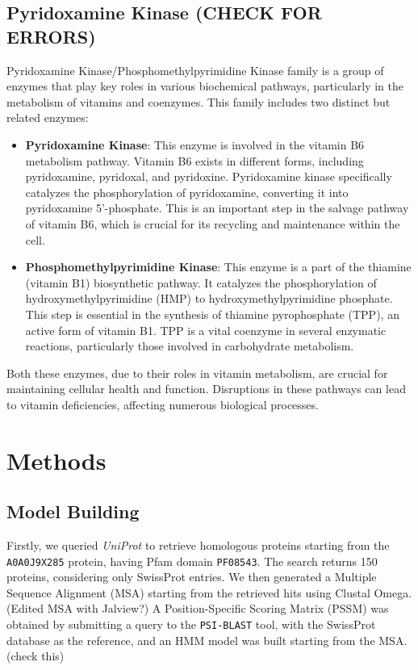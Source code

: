 \documentclass[10pt,twocolumn,letterpaper]{article}
\begin{document}
\subsection{Pyridoxamine Kinase (CHECK FOR ERRORS)}

Pyridoxamine Kinase/Phosphomethylpyrimidine Kinase family is a group of enzymes that play key roles in various biochemical pathways, particularly in the metabolism of vitamins and coenzymes. This family includes two distinct but related enzymes:

\begin{itemize}
\item \textbf{Pyridoxamine Kinase}: This enzyme is involved in the vitamin B6 metabolism pathway. Vitamin B6 exists in different forms, including pyridoxamine, pyridoxal, and pyridoxine. Pyridoxamine kinase specifically catalyzes the phosphorylation of pyridoxamine, converting it into pyridoxamine 5'-phosphate. This is an important step in the salvage pathway of vitamin B6, which is crucial for its recycling and maintenance within the cell.

\item \textbf{Phosphomethylpyrimidine Kinase}: This enzyme is a part of the thiamine (vitamin B1) biosynthetic pathway. It catalyzes the phosphorylation of hydroxymethylpyrimidine (HMP) to hydroxymethylpyrimidine phosphate. This step is essential in the synthesis of thiamine pyrophosphate (TPP), an active form of vitamin B1. TPP is a vital coenzyme in several enzymatic reactions, particularly those involved in carbohydrate metabolism.
\end{itemize}

Both these enzymes, due to their roles in vitamin metabolism, are crucial for maintaining cellular health and function. Disruptions in these pathways can lead to vitamin deficiencies, affecting numerous biological processes.

\section{Methods}

\subsection{Model Building}

Firstly, we queried \textit{UniProt} to retrieve homologous proteins starting from the \texttt{A0A0J9X285} protein, having Pfam domain \texttt{PF08543}. The search returns 150 proteins, considering only SwissProt entries. We then generated a Multiple Sequence Alignment (MSA) starting from the retrieved hits using Clustal Omega.
(Edited MSA with Jalview?)
A Position-Specific Scoring Matrix (PSSM) was obtained by submitting a query to the \texttt{PSI-BLAST} tool, with the SwissProt database as the reference, and an HMM model was built starting from the MSA. (check this)
\end{document}
